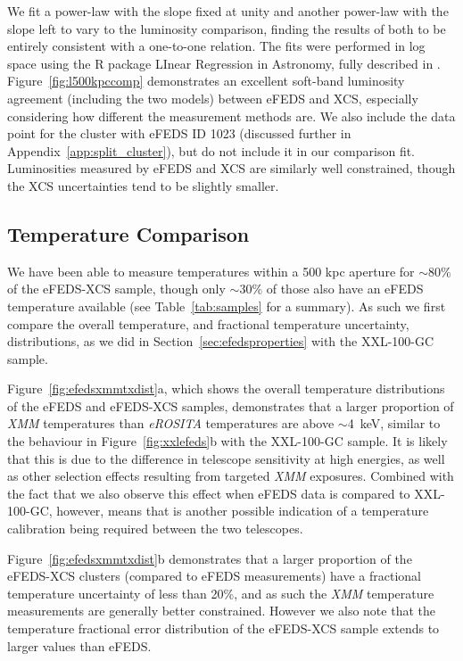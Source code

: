 \documentclass[fleqn,usenatbib]{mnras}
\begin{document}

We fit a power-law with the slope fixed at unity and another power-law with the slope left to vary to the luminosity comparison, finding the results of both to be entirely consistent with a one-to-one relation. The fits were performed in log space using the R package LInear Regression in Astronomy\citep[{\sc lira}\footnote{\href{https://cran.r-project.org/web/packages/lira/index.html}{LInear Regression in Astronomy}}, ][]{softlira}, fully described in \cite{LIRA}. Figure~\ref{fig:l500kpccomp} demonstrates an excellent soft-band luminosity agreement (including the two models) between eFEDS and XCS, especially considering how different the measurement methods are. We also include the data point for the cluster with eFEDS ID 1023 (discussed further in Appendix~\ref{app:split_cluster}), but do not include it in our comparison fit. Luminosities measured by eFEDS and XCS are similarly well constrained, though the XCS uncertainties tend to be slightly smaller.

\subsection{Temperature Comparison}
We have been able to measure temperatures within a 500 kpc aperture for ${\sim}$80\% of the eFEDS-XCS sample, though only ${\sim}$30\% of those also have an eFEDS temperature available (see Table~\ref{tab:samples} for a summary). As such we first compare the overall temperature, and fractional temperature uncertainty, distributions, as we did in Section~\ref{sec:efedsproperties} with the XXL-100-GC sample.

Figure~\ref{fig:efedsxmmtxdist}a, which shows the overall temperature distributions of the eFEDS and eFEDS-XCS samples, demonstrates that a larger proportion of {\em XMM} temperatures than {\em eROSITA} temperatures are above ${\sim}$4~keV, similar to the behaviour in Figure~\ref{fig:xxlefeds}b with the XXL-100-GC sample. It is likely that this is due to the difference in telescope sensitivity at high energies, as well as other selection effects resulting from targeted {\em XMM} exposures. Combined with the fact that we also observe this effect when eFEDS data is compared to XXL-100-GC, however, means that is another possible indication of a temperature calibration being required between the two telescopes. 

Figure~\ref{fig:efedsxmmtxdist}b demonstrates that a larger proportion of the eFEDS-XCS clusters (compared to eFEDS measurements) have a fractional temperature uncertainty of less than 20\%, and as such the {\em XMM} temperature measurements are generally better constrained. However we also note that the temperature fractional error distribution of the eFEDS-XCS sample extends to larger values than eFEDS. 
\end{document}
